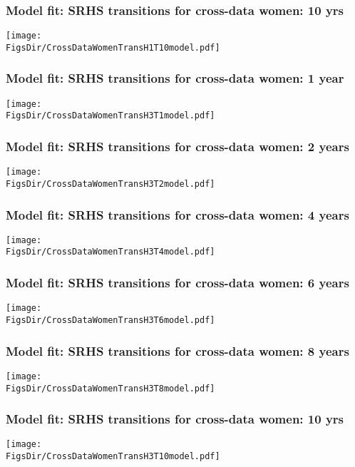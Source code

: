 \documentclass[aspectratio=169]{beamer}
\newcommand{\FigsDir}{../Figures}
\begin{document}
\begin{frame}\frametitle{Model fit: SRHS transitions for cross-data women: 10 yrs}
\begin{center}
\texttt{[image: \\FigsDir/CrossDataWomenTransH1T10model.pdf]}
\end{center}
\end{frame}

\begin{frame}\frametitle{Model fit: SRHS transitions for cross-data women: 1 year}
\begin{center}
	\texttt{[image: \\FigsDir/CrossDataWomenTransH3T1model.pdf]}
\end{center}
\end{frame}

\begin{frame}\frametitle{Model fit: SRHS transitions for cross-data women: 2 years}
\begin{center}
	\texttt{[image: \\FigsDir/CrossDataWomenTransH3T2model.pdf]}
\end{center}
\end{frame}

\begin{frame}\frametitle{Model fit: SRHS transitions for cross-data women: 4 years}
\begin{center}
	\texttt{[image: \\FigsDir/CrossDataWomenTransH3T4model.pdf]}
\end{center}
\end{frame}

\begin{frame}\frametitle{Model fit: SRHS transitions for cross-data women: 6 years}
\begin{center}
	\texttt{[image: \\FigsDir/CrossDataWomenTransH3T6model.pdf]}
\end{center}
\end{frame}

\begin{frame}\frametitle{Model fit: SRHS transitions for cross-data women: 8 years}
\begin{center}
	\texttt{[image: \\FigsDir/CrossDataWomenTransH3T8model.pdf]}
\end{center}
\end{frame}

\begin{frame}\frametitle{Model fit: SRHS transitions for cross-data women: 10 yrs}
\begin{center}
	\texttt{[image: \\FigsDir/CrossDataWomenTransH3T10model.pdf]}
\end{center}
\end{frame}
\end{document}
